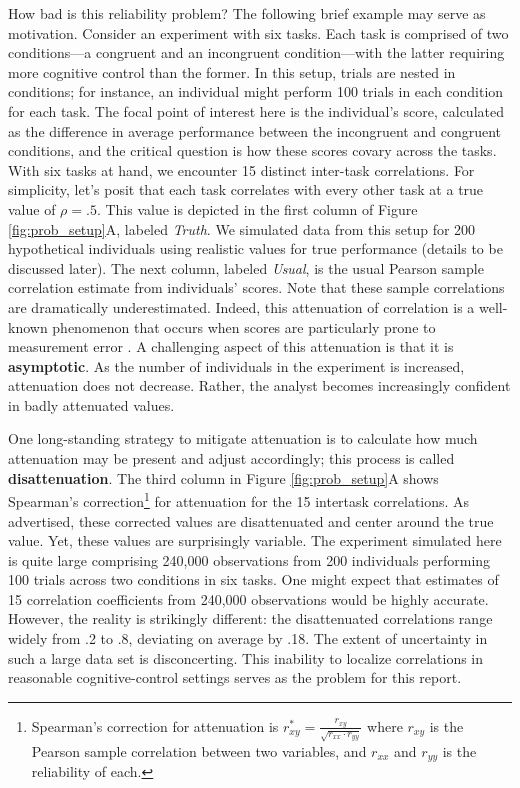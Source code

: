 \documentclass[man, 12pt]{apa7} %
\begin{document}
How bad is this reliability problem?  The following brief example may serve as motivation.  Consider an experiment with six tasks.  Each task is comprised of two conditions---a congruent and an incongruent condition---with the latter requiring more cognitive control than the former.  In this setup, trials are nested in conditions; for instance, an individual might perform 100 trials in each condition for each task. The focal point of interest here is the individual's score, calculated as the difference in average performance between the incongruent and congruent conditions, and the critical question is how these scores covary across the tasks. With six tasks at hand, we encounter 15 distinct inter-task correlations. For simplicity, let's posit that each task correlates with every other task at a true value of $\rho=.5$. This value is depicted in the first column of Figure \ref{fig:prob_setup}A, labeled \textit{Truth}. We simulated data from this setup for 200 hypothetical individuals using realistic values for true performance (details to be discussed later). The next column, labeled \textit{Usual}, is the usual Pearson sample correlation estimate from individuals' scores.  Note that these sample correlations are dramatically underestimated.  Indeed, this attenuation of correlation is a well-known phenomenon that occurs when scores are particularly prone to measurement error \parencite{Spearman.1904}.  A challenging aspect of this attenuation is that it is \textbf{asymptotic}.  As the number of individuals in the experiment is increased, attenuation does not decrease.  Rather, the analyst becomes increasingly confident in badly attenuated values.


One long-standing strategy to mitigate attenuation is to calculate how much attenuation may be present and adjust accordingly; this process is called \textbf{disattenuation}.  The third column in Figure \ref{fig:prob_setup}A shows Spearman's correction\footnote{Spearman's correction for attenuation is $r^*_{xy} = \frac{r_{xy}}{\sqrt{r_{xx}\cdot r_{yy}}}$ where $r_{xy}$ is the Pearson sample correlation between two variables, and $r_{xx}$ and $r_{yy}$ is the reliability of each.} for attenuation \parencite{Spearman.1904} for the 15 intertask correlations. As advertised, these corrected values are disattenuated and center around the true value.  Yet, these values are surprisingly variable.  The experiment simulated here is quite large comprising 240,000 observations from 200 individuals performing 100 trials across two conditions in six tasks.  One might expect that estimates of 15 correlation coefficients from 240,000 observations would be highly accurate. However, the reality is strikingly different: the disattenuated correlations range widely from .2 to .8, deviating on average by .18. The extent of uncertainty in such a large data set is disconcerting. This inability to localize correlations in reasonable cognitive-control settings serves as the problem for this report.
\end{document}

